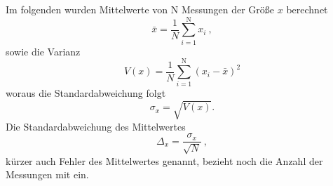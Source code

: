 Im folgenden wurden Mittelwerte von N Messungen der Größe $x$ berechnet
\begin{equation}
\bar{x} =  \frac{1}{N} \sum_{i=1}^\text{N} x_i \ ,
\end{equation}
sowie die Varianz
\begin{equation}
V(x) = \frac{1}{N} \sum_{i=1}^\text{N} (x_i - \bar{x})^2
\end{equation}
woraus die Standardabweichung folgt
\begin {equation}
\sigma_x = \sqrt{V(x)}.
\end{equation}
Die Standardabweichung des Mittelwertes
\begin{equation}
\Delta_{x} = \frac{\sigma_x}{\sqrt{N}} \ ,
\end{equation}
kürzer auch Fehler des Mittelwertes genannt, bezieht noch die Anzahl der Messungen mit ein.